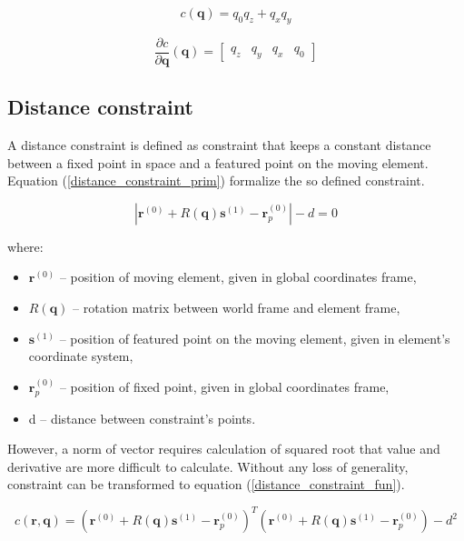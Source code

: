 \begin{equation}
	c \left( \bm{q} \right) = q_{0}q_{z}+q_{x}q_{y}
	\label{yaw_constraint_fun}
\end{equation}

\begin{equation}
	\frac{\partial c}{\partial \bm{q}}  \left( \bm{q} \right) =
	\begin{bmatrix}
	 q_{z} &  q_{y} &  q_{x} &  q_{0}
	\end{bmatrix}
	\label{yaw_constraint_fun_der}
\end{equation}

\subsection{Distance constraint}

A distance constraint is defined as constraint that keeps a constant distance between a fixed point in space and a featured point on the moving element. Equation (\ref{distance_constraint_prim}) formalize the so defined constraint.

\begin{equation}
	\left| \bm{r}^{(0)} + R(\bm{q})\bm{s}^{(1)} - \bm{r}_p^{(0)} \right| - d = 0
	\label{distance_constraint_prim}
\end{equation}

where:
\begin{itemize}[noitemsep]
	\item $\bm{r}^{(0)}$ -- position of moving element, given in global coordinates frame,
	\item $R(\bm{q})$ -- rotation matrix between world frame and element frame,
	\item $\bm{s}^{(1)}$ -- position of featured point on the moving element, given in element's coordinate system,
	\item $\bm{r}_p^{(0)}$ -- position of fixed point, given in global coordinates frame,
	\item d -- distance between constraint's points.
\end{itemize}

However, a norm of vector requires calculation of squared root that value and derivative are more difficult to calculate. Without any loss of generality, constraint can be transformed to equation (\ref{distance_constraint_fun}).

\begin{equation}
	c(\bm{r}, \bm{q}) = \left( \bm{r}^{(0)} + R(\bm{q})\bm{s}^{(1)} - \bm{r}_p^{(0)} \right)^T \left( \bm{r}^{(0)} + R(\bm{q})\bm{s}^{(1)} - \bm{r}_p^{(0)} \right) - d^2
	\label{distance_constraint_fun}
\end{equation}

